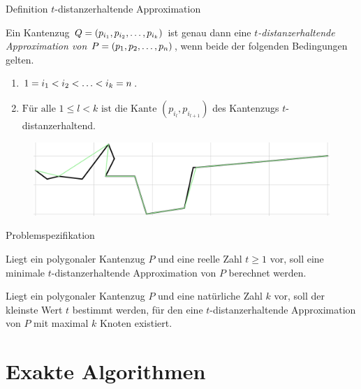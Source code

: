 \documentclass{beamer}
\begin{document}
	\begin{frame}{Definition $t$-distanzerhaltende Approximation}
		\begin{definition}
			Ein Kantenzug $Q = (p_{i_1}, p_{i_2}, \mathellipsis, p_{i_k})$ ist genau dann eine \emph{$t$-distanzerhaltende Approximation von $P = (p_1, p_2, \mathellipsis, p_n)$}, wenn beide der folgenden Bedingungen gelten.
			\begin{enumerate}
				\item $\displaystyle 1 = i_1 < i_2 < \mathellipsis < i_k = n$.
				\item $\displaystyle \text{Für alle } 1 \leq l < k \text{ ist die Kante } (p_{i_l}, p_{i_{l+1}})$ des Kantenzugs $t$-distanzerhaltend.
			\end{enumerate}
		\end{definition}
		\begin{figure}
			\includegraphics[width=\textwidth]{approximation_example.png}
		\end{figure}
	\end{frame}
	
	\begin{frame}{Problemspezifikation}
		\begin{definition}
			Liegt ein polygonaler Kantenzug $P$ und eine reelle Zahl $t \geq 1$ vor, soll eine minimale $t$-distanzerhaltende Approximation von $P$ berechnet werden.
		\end{definition}
		\begin{definition}
			Liegt ein polygonaler Kantenzug $P$ und eine natürliche Zahl $k$ vor, soll der kleinste Wert $t$ bestimmt werden, für den eine $t$-distanzerhaltende Approximation von $P$ mit maximal $k$ Knoten existiert.
		\end{definition}

	\end{frame}
	
	\section{Exakte Algorithmen}
\end{document}
